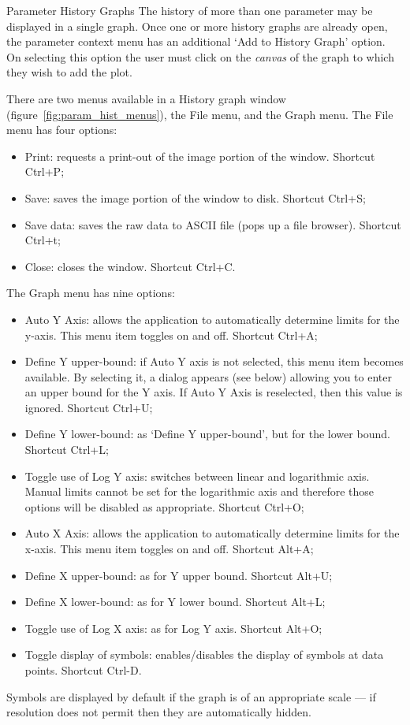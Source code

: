 \documentclass[a4paper,twoside]{article}
\begin{document}
\begin{section}{Parameter History Graphs}
The history of more than one parameter may be displayed in a single
graph.  Once one or more history graphs are already open, the
parameter context menu has an additional `Add to History Graph'
option. On selecting this option the user must click on the {\em canvas} of
the graph to which they wish to add the plot.

There are two menus available in a History graph window 
(figure~\ref{fig:param_hist_menus}), the File menu, and the Graph
menu. The File menu has four options:
\begin{itemize}
\item Print: requests a print-out of the image portion of the window. 
Shortcut Ctrl+P;
\item Save: saves the image portion of the window to disk. Shortcut Ctrl+S;
\item Save data: saves the raw data to ASCII file (pops up a file browser). 
Shortcut Ctrl+t;
\item Close: closes the window. Shortcut Ctrl+C.
\end{itemize}
The Graph menu has nine options:
\begin{itemize}
\item Auto Y Axis: allows the application to automatically determine 
limits for the y-axis. This menu item toggles on and off. 
Shortcut Ctrl+A;
\item Define Y upper-bound: if Auto Y axis is not selected, this 
menu item becomes available. By selecting it, a dialog appears 
(see below) allowing you to enter an upper bound for the Y axis. 
If Auto Y Axis is reselected, then this value is ignored. 
Shortcut Ctrl+U;
\item Define Y lower-bound: as `Define Y upper-bound', but for 
the lower bound. Shortcut Ctrl+L;
\item Toggle use of Log Y axis: switches between linear and 
logarithmic axis.  Manual limits cannot be set for the logarithmic 
axis and therefore those options will be disabled as appropriate. 
Shortcut Ctrl+O;
\item Auto X Axis: allows the application to automatically 
determine limits for the x-axis. This menu item toggles on and 
off. Shortcut Alt+A;
\item Define X upper-bound: as for Y upper bound. Shortcut Alt+U;
\item Define X lower-bound: as for Y lower bound. Shortcut Alt+L;
\item Toggle use of Log X axis:	as for Log Y axis. Shortcut Alt+O;
\item Toggle display of symbols: enables/disables the display of 
symbols at data points. Shortcut Ctrl-D.
\end{itemize}
Symbols are displayed by default if the graph is of an appropriate
scale --- if resolution does not permit then they are automatically
hidden.


\end{section}
\end{document}
